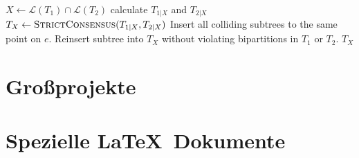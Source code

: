 \documentclass[titlepage]{scrartcl}
\theoremstyle{das_hat_stil}
\begin{document}
\begin{algorithm}[H]
\caption{Strict Consensus Merger}
\begin{algorithmic}[1]
    \State $X \gets \mathcal{L}(T_1) \cap \mathcal{L}(T_2)$
     
      \State calculate $T_{1|X}$ and $T_{2|X}$
      \State $T_X \gets \textsc{StrictConsensus}(T_{1|X}, T_{2|X})$
         
          \State Insert all colliding subtrees to the same point on $e$. 
        \Else
          \State Reinsert subtree into $T_X$ without violating bipartitions in $T_1$ or $T_2$.
        \EndIf
      \EndFor
      \State \Return $T_X$
    \EndIf
  \EndFunction
\end{algorithmic}
\end{algorithm}







\section{Großprojekte} %

\section{Spezielle \LaTeX \ Dokumente}





\newpage
\listoffigures
\listoftables

\label{LastPage} %
\end{document}
